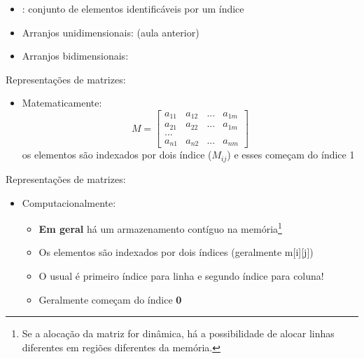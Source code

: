 \documentclass[portuguese,10pt,xcolor=table]{bredelebeamer}
\begin{document}
	\begin{frame}{\insertsection}
		\begin{itemize}
			\item {}: conjunto de elementos identificáveis por um índice
			\item Arranjos unidimensionais:  (aula anterior)
			\item Arranjos bidimensionais: 
		\end{itemize}
	\end{frame}	
	
	\begin{frame}{\insertsection}
		Representações de matrizes:
		\begin{itemize}
			\item Matematicamente:\\
				$$
				M = \begin{bmatrix}
					a_{11} & a_{12} & ... & a_{1m}            \\[0.3em]
					a_{21} & a_{22} & ... & a_{1m}            \\[0.3em]
					... & & \\[0.3em]
					a_{n1} & a_{n2} & ... & a_{nm}
				\end{bmatrix}
				$$
				os elementos são indexados por dois índice ($M_{ij}$) e esses começam do índice 1
		\end{itemize}
	\end{frame}	
	
	\begin{frame}{\insertsection}
		Representações de matrizes:
		\begin{itemize}
			\item Computacionalmente:
				\begin{itemize}
					\item \textbf{Em geral} há um armazenamento contíguo na memória\footnote{Se a alocação da matriz for dinâmica, há a possibilidade de alocar linhas diferentes em regiões diferentes da memória.}
					\item Os elementos são indexados por dois índices (geralmente m[i][j])
					\item O usual é primeiro índice para linha e segundo índice para coluna!
					\item Geralmente começam do índice \textbf{0}
				\end{itemize}
		\end{itemize}
	\end{frame}	
	
\end{document}
